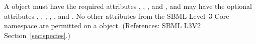 A \Species object must have the required attributes ,
, ,
 and , and may have the optional
attributes , , ,
, , 
and .  No other attributes from the SBML Level~3
Core namespace are permitted on a \Species object.  (References: SBML L3V2
Section~\ref{sec:species}.)
